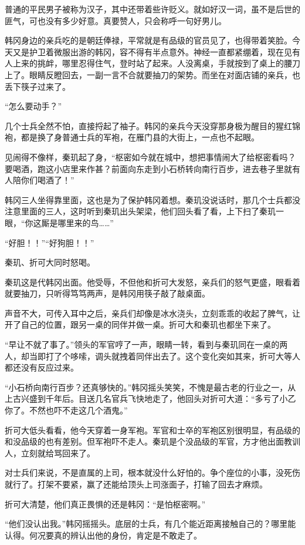普通的平民男子被称为汉子，其中还带着些许贬义。就如好汉一词，虽不是后世的匪气，可也没有多少好意。真要赞人，只会称呼一句好男儿。

韩冈身边的亲兵吃的是朝廷俸禄，平常就是有品级的官员见了，也得带着笑脸。今天又是护卫着微服出游的韩冈，容不得有半点意外。神经一直都紧绷着，现在见有人上来的挑衅，哪里忍得住气，登时站了起来。人没离桌，手就按到了桌上的腰刀上了。眼睛反瞪回去，一副一言不合就要抽刀的架势。而坐在对面店铺的亲兵，也丢下筷子过来了。

“怎么要动手？”

几个士兵全然不怕，直接捋起了袖子。韩冈的亲兵今天没穿那身极为醒目的猩红锦袍，都是换了身普通士兵的军袍，在雁门县的大街上，一点也不起眼。

见闹得不像样，秦玑起了身，“枢密如今就在城中，想把事情闹大了给枢密看吗？要喝酒，跑这小店里来作甚？前面向东走到小石桥转向南行百步，进去巷子里就有人陪你们喝酒了！”

韩冈三人坐得靠里面，这也是为了保护韩冈着想。秦玑没说话时，那几个士兵都没注意里面的三人，这时听到秦玑出头架梁，他们回头看了看，上下扫了秦玑一眼，“你这厮是哪里来的鸟……”

“好胆！！”“好狗胆！！”

秦玑、折可大同时怒喝。

秦玑这是代韩冈出面。他受辱，不但他和折可大发怒，亲兵们的怒气更盛，眼看着就要抽刀，只听得笃笃两声，是韩冈用筷子敲了敲桌面。

声音不大，可传入耳中之后，亲兵们却像是冰水浇头，立刻乖乖的收起了脾气，让开了自己的位置，跟另一桌的同伴并做一桌。折可大和秦玑也都坐下来了。

“早让不就了事了。”领头的军官哼了一声，眼睛一转，看到与秦玑同在一桌的两人，却当即打了个哆嗦，调头就拽着同伴出去了。这个变化突如其来，折可大等人都还没有反应过来。

“小石桥向南行百步？还真够快的。”韩冈摇头笑笑，不愧是最古老的行业之一，从上古兴盛到千年后。目送几名官兵飞快地走了，他回头对折可大道：“多亏了小乙你了。不然也吓不走这几个酒鬼。”

折可大低头看看，他今天穿着一身军袍。军官和士卒的军袍区别很明显，有品级的和没品级的也有差别。但军袍吓不走人。秦玑是个没品级的军官，方才他出面教训人，立刻就给骂回来了。

对士兵们来说，不是直属的上司，根本就没什么好怕的。争个座位的小事，没死伤就行了。打架不要紧，赢了还能给顶头上司涨面子，打输了回去才麻烦。

折可大清楚，他们真正畏惧的还是韩冈：“是怕枢密啊。”

“他们没认出我。”韩冈摇摇头。底层的士兵，有几个能近距离接触自己的？哪里能认得。何况要真的辨认出他的身份，肯定是不敢走了。

